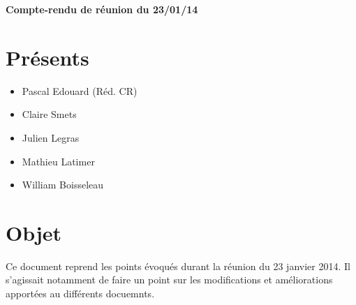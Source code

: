 \documentclass[a4paper,11pt,french]{article}
\author{\hmwkAuthorName}
\date{} %
\newcommand{\hmwkDocName}{Compte-rendu de réunion du 23/01/14} %
\begin{document}
\pagestyle{fancy}

\begin{center}\textbf{\Huge{\hmwkDocName}}\end{center}
	
\section{Présents}
\begin{itemize}
\item Pascal Edouard (Réd. CR) 
\item Claire Smets
\item Julien Legras
\item Mathieu Latimer
\item William Boisseleau
\end{itemize}

\section{Objet}
Ce document reprend les points évoqués durant la réunion du 23 janvier 2014. Il s'agissait notamment de faire un point sur les modifications et améliorations apportées au différents docuemnts. 
\end{document}
